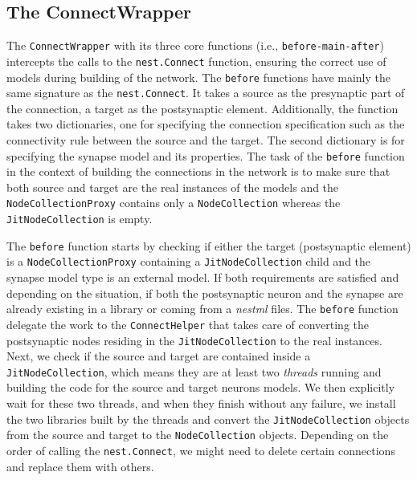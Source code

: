 \subsection{The ConnectWrapper}

The \texttt{ConnectWrapper} with its three core functions (i.e., \texttt{before-main-after}) intercepts the calls to the \texttt{nest.Connect} function, ensuring the correct use of models during building of the network. The \texttt{before} functions have mainly the same signature as the \texttt{nest.Connect}. It takes a source as the presynaptic part of the connection, a target as the postsynaptic element. Additionally, the function takes two dictionaries, one for specifying the connection specification such as the connectivity rule between the source and the target. The second dictionary is for specifying the synapse model and its properties. The task of the \texttt{before} function in the context of building the connections in the network is to make sure that both source and target are the real instances of the models and the \texttt{NodeCollectionProxy} contains only a \texttt{NodeCollection} whereas the \texttt{JitNodeCollection} is empty. 

The \texttt{before} function starts by checking if either the target (postsynaptic element) is a \texttt{NodeCollectionProxy} containing a \texttt{JitNodeCollection} child and the synapse model type is an external model. If both requirements are satisfied and depending on the situation, if both the postsynaptic neuron and the synapse are already existing in a library or coming from a \emph{nestml} files. The \texttt{before} function delegate the work to the \texttt{ConnectHelper} that takes care of converting the postsynaptic nodes residing in the \texttt{JitNodeCollection} to the real instances. Next, we check if the source and target are contained inside a \texttt{JitNodeCollection}, which means they are at least two \emph{threads} running and building the code for the source and target neurons models. We then explicitly wait for these two threads, and when they finish without any failure, we install the two libraries built by the threads and convert the \texttt{JitNodeCollection} objects from the source and target to the \texttt{NodeCollection} objects. Depending on the order of calling the \texttt{nest.Connect}, we might need to delete certain connections and replace them with others. 

